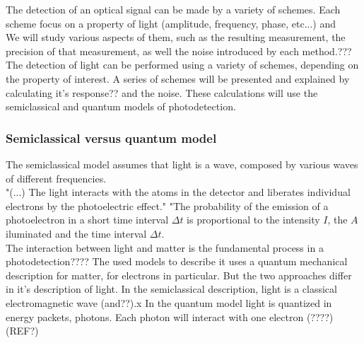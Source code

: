 \begin{bibunit}[plain]
The detection of an optical signal can be made by a variety of schemes. Each scheme focus on a property of light (amplitude, frequency, phase, etc...) and 
\\
We will study various aspects of them, such as the resulting measurement, the precision of that measurement, as well the noise introduced by each method.???
\\
The detection of light can be performed using a variety of schemes, depending on the property of interest. A series of schemes will be presented and explained by calculating it's response?? and the noise. These calculations will use the semiclassical and quantum models of photodetection.




\subsubsection{Semiclassical versus quantum model}



The semiclassical model assumes that light is a wave, composed by various waves of different frequencies.\\


"(...) The light interacts with the atoms in the detector and liberates individual electrons by the photoelectric effect."
"The probability of the emission of a photoelectron in a short time interval $\Delta t$ is proportional to the intensity $I$, the $A$ iluminated and the time interval $\Delta t$.\\




The interaction between light and matter is the fundamental process in a photodetection???? The used models to describe it uses a quantum mechanical description for matter, for electrons in particular. But the two approaches differ in it's description of light. In the semiclassical description, light is a classical electromagnetic wave (and??).x
In the quantum model light is quantized in energy packets, photons. Each photon will interact with one electron (????)\\
(REF?)\\


\end{bibunit}
